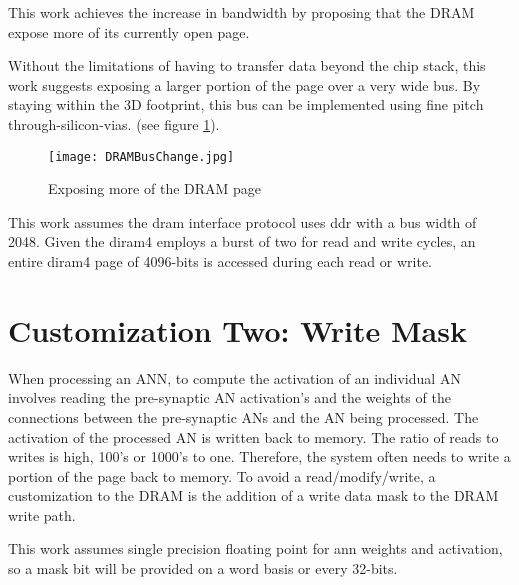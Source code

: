 This work achieves the increase in bandwidth by proposing that the DRAM expose more of its currently open page.

Without the limitations of having to transfer data beyond the chip stack, this work suggests exposing a larger portion of the page over a very wide bus. By staying within the 3D footprint, this bus can be implemented using fine pitch through-silicon-vias.
(see figure \ref{fig:dramBusChange}).

\begin{figure}[!t]
\centering
\captionsetup{justification=centering}
\captionsetup{width=.9\linewidth}
\centerline{
\mbox{\texttt{[image: DRAMBusChange.jpg]}}
}
\caption{Exposing more of the DRAM page}
\label{fig:dramBusChange}
\end{figure}

This work assumes the \ac{dram} interface protocol uses \ac{ddr} with a bus width of 2048. Given the \ac{diram4} employs a burst of two for read and write cycles, an entire \ac{diram4} page of 4096-bits is accessed during each read or write. 

\section{Customization Two: Write Mask}
\label{sec:Write Mask}
When processing an ANN, to compute the activation of an individual AN involves reading the pre-synaptic AN activation's and the weights of the connections between the pre-synaptic ANs and the AN being processed. The activation of the processed AN is written back to memory. The ratio of reads to writes is high, 100's or 1000's to one. Therefore, the system often needs to write a portion of the page back to memory. To avoid a read/modify/write, a customization to the DRAM is the addition of a write data mask to the DRAM write path.

This work assumes single precision floating point for \ac{ann} weights and activation, so a mask bit will be provided on a word basis or every 32-bits.

